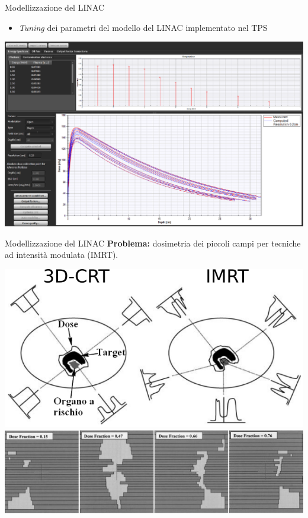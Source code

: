 \documentclass{beamer}
\begin{document}
\begin{frame}{Modellizzazione del LINAC}
\begin{itemize}
\scriptsize
{}
\item \alert{\textit{Tuning} dei parametri del modello del LINAC implementato nel TPS}
\end{itemize}
\vspace{.5cm}
\centering
\includegraphics[width=\textwidth]{./img/RayPhysics_gui.PNG}
\end{frame}



\begin{frame}[t]{Modellizzazione del LINAC}
\footnotesize
\alert{\textbf{Problema:}} dosimetria dei piccoli campi per tecniche ad intensità modulata (IMRT).
\begin{center}
\includegraphics[width=.6\textwidth]{../cap2/3D_IMRT.png}\\\vspace{.3cm}
\includegraphics[width=.6\textwidth]{../cap2/IMRT_Segments_2.jpg}
\end{center}
\end{frame}
\end{document}
